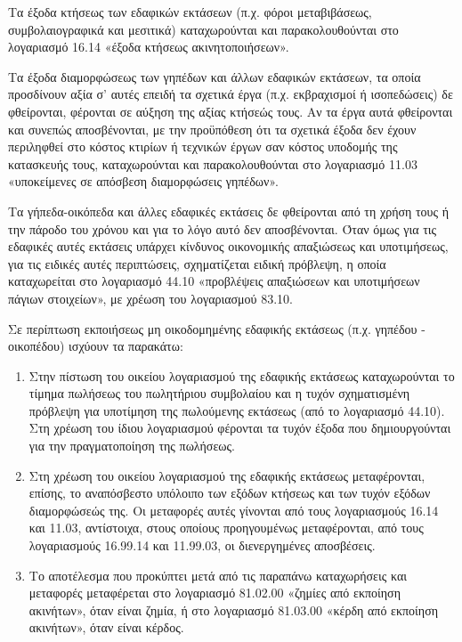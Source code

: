 \documentclass[A4,10pt,greek]{book}
\begin{document}
Τα έξοδα κτήσεως των εδαφικών εκτάσεων (π.χ. φόροι μεταβιβάσεως, συμβολαιογραφικά και μεσιτικά) καταχωρούνται και παρακολουθούνται στο λογαριασμό 16.14 «έξοδα κτήσεως ακινητοποιήσεων».

Τα έξοδα διαμορφώσεως των γηπέδων και άλλων εδαφικών εκτάσεων, τα οποία προσδίνουν αξία σ' αυτές επειδή τα σχετικά έργα (π.χ. εκβραχισμοί ή ισοπεδώσεις) δε φθείρονται, φέρονται σε αύξηση της αξίας κτήσεώς τους. Αν τα έργα αυτά φθείρονται και συνεπώς αποσβένονται, με την προϋπόθεση ότι τα σχετικά έξοδα δεν έχουν περιληφθεί στο κόστος κτιρίων ή τεχνικών έργων σαν κόστος υποδομής της κατασκευής τους, καταχωρούνται και παρακολουθούνται στο λογαριασμό 11.03 «υποκείμενες σε απόσβεση διαμορφώσεις γηπέδων».

Τα γήπεδα-οικόπεδα και άλλες εδαφικές εκτάσεις δε φθείρονται από τη χρήση τους ή την πάροδο του χρόνου και για το λόγο αυτό δεν αποσβένονται. Όταν όμως για τις εδαφικές αυτές εκτάσεις υπάρχει κίνδυνος οικονομικής απαξιώσεως και υποτιμήσεως, για τις ειδικές αυτές περιπτώσεις, σχηματίζεται ειδική πρόβλεψη, η οποία καταχωρείται στο λογαριασμό 44.10 «προβλέψεις απαξιώσεων και υποτιμήσεων πάγιων στοιχείων», με χρέωση του λογαριασμού 83.10.

Σε περίπτωση εκποιήσεως μη οικοδομημένης εδαφικής εκτάσεως (π.χ. γηπέδου - οικοπέδου) ισχύουν τα παρακάτω:

\begin{enumerate}

\item Στην πίστωση του οικείου λογαριασμού της εδαφικής εκτάσεως καταχωρούνται το τίμημα πωλήσεως του πωλητήριου συμβολαίου και η τυχόν σχηματισμένη πρόβλεψη για υποτίμηση της πωλούμενης εκτάσεως (από το λογαριασμό 44.10). Στη χρέωση του ίδιου λογαριασμού φέρονται τα τυχόν έξοδα που δημιουργούνται για την πραγματοποίηση της πωλήσεως.

\item Στη χρέωση του οικείου λογαριασμού της εδαφικής εκτάσεως μεταφέρονται, επίσης, το αναπόσβεστο υπόλοιπο των εξόδων κτήσεως και των τυχόν εξόδων διαμορφώσεώς της. Οι μεταφορές αυτές γίνονται από τους λογαριασμούς 16.14 και 11.03, αντίστοιχα, στους οποίους προηγουμένως μεταφέρονται, από τους λογαριασμούς 16.99.14 και 11.99.03, οι διενεργημένες αποσβέσεις.

\item Το αποτέλεσμα που προκύπτει μετά από τις παραπάνω καταχωρήσεις και μεταφορές μεταφέρεται στο λογαριασμό 81.02.00 «ζημίες από εκποίηση ακινήτων», όταν είναι ζημία, ή στο λογαριασμό 81.03.00 «κέρδη από εκποίηση ακινήτων», όταν είναι κέρδος.

\end{enumerate}
\end{document}

